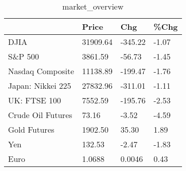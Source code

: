 \documentclass{article}%
\begin{document}
%


\begin{table}[htbp]%
\caption{market\_overview}%
\centering%
\begin{adjustbox}{width=1\textwidth}%
\begin{tabular}{llll}
\toprule
                  &    Price &     Chg &  \%Chg \\
\midrule
             DJIA & 31909.64 & -345.22 & -1.07 \\
          S\&P 500 &  3861.59 &  -56.73 & -1.45 \\
 Nasdaq Composite & 11138.89 & -199.47 & -1.76 \\
Japan: Nikkei 225 & 27832.96 & -311.01 & -1.11 \\
     UK: FTSE 100 &  7552.59 & -195.76 & -2.53 \\
Crude Oil Futures &    73.16 &   -3.52 & -4.59 \\
     Gold Futures &  1902.50 &   35.30 &  1.89 \\
              Yen &   132.53 &   -2.47 & -1.83 \\
             Euro &   1.0688 &  0.0046 &  0.43 \\
\bottomrule
\end{tabular}
%
\end{adjustbox}%
\end{table}

%
\end{document}
